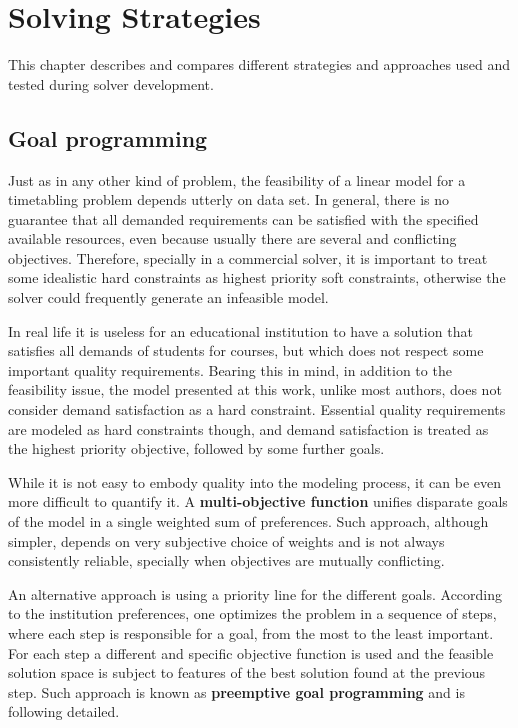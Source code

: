 \chapter{Solving Strategies}
\label{chap:strategies}

This chapter describes and compares different strategies and approaches used and tested during solver development.


\section{Goal programming}

Just as in any other kind of problem, the feasibility of a linear model for a timetabling problem depends utterly on data set. In general, there is no guarantee that all demanded requirements can be satisfied with the specified available resources, even because usually there are several and conflicting objectives. Therefore, specially in a commercial solver, it is important to treat some idealistic hard constraints as highest priority soft constraints, otherwise the solver could frequently generate an infeasible model.

In real life it is useless for an educational institution to have a solution that satisfies all demands of students for courses, but which does not respect some important quality requirements. Bearing this in mind, in addition to the feasibility issue, the model presented at this work, unlike most authors, does not consider demand satisfaction as a hard constraint. Essential quality requirements are modeled as hard constraints though, and demand satisfaction is treated as the highest priority objective, followed by some further goals.

While it is not easy to embody quality into the modeling process, it can be even more difficult to quantify it. A \textbf{multi-objective function} unifies disparate goals of the model in a single weighted sum of preferences. Such approach, although simpler, depends on very subjective choice of weights and is not always consistently reliable, specially when objectives are mutually conflicting.

An alternative approach is using a priority line for the different goals. According to the institution preferences, one optimizes the problem in a sequence of steps, where each step is responsible for a goal, from the most to the least important. For each step a different and specific objective function is used and the feasible solution space is subject to features of the best solution found at the previous step. Such approach is known as \textbf{preemptive goal programming} and is following detailed.


